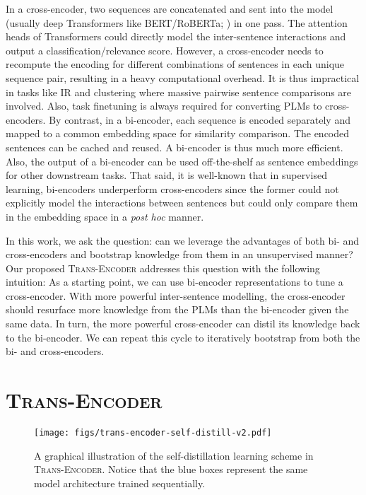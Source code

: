 \documentclass{article} \usepackage{iclr2021_conference,times}
\newcommand{\modelname}{\textsc{Trans-Encoder}\xspace}
\begin{document}
In a cross-encoder, two sequences are concatenated and sent into the model (usually deep Transformers like BERT/RoBERTa; \citealt{devlin2019bert,liu2019roberta}) in one pass. 
The attention heads of Transformers could directly model the inter-sentence interactions and output a classification/relevance score. 
However, a cross-encoder needs to recompute the encoding for different combinations of sentences in each unique sequence pair, resulting in a heavy computational overhead. 
It is thus impractical in tasks like IR and clustering where massive pairwise sentence comparisons are involved. 
Also, task finetuning is always required for converting PLMs to cross-encoders. 
By contrast, in a bi-encoder, each sequence is encoded separately and mapped to a common embedding space for similarity comparison. 
The encoded sentences can be cached and reused. 
A bi-encoder is thus much more efficient. 
Also, the output of a bi-encoder can be used off-the-shelf as sentence embeddings for other downstream tasks. 
That said, it is well-known that in supervised learning, bi-encoders underperform cross-encoders \citep{Humeau2020Poly,thakur-etal-2021-augmented} since the former could not explicitly model the interactions between sentences but could only compare them in the embedding space in a \textit{post hoc} manner.

In this work, we ask the question: can we leverage the advantages of both bi- and cross-encoders and bootstrap knowledge from them in an unsupervised manner? 
Our proposed \modelname addresses this question with the following intuition: As a starting point, we can use bi-encoder representations to tune a cross-encoder. 
With more powerful inter-sentence modelling, the cross-encoder should resurface more knowledge from the PLMs than the bi-encoder given the same data. 
In turn, the more powerful cross-encoder can distil its knowledge back to the bi-encoder. 
We can repeat this cycle to iteratively bootstrap from both the bi- and cross-encoders. 


\section{\modelname}

\begin{figure}
    \centering
    \texttt{[image: figs/trans-encoder-self-distill-v2.pdf]}
    \vspace{-2mm}
    \caption{A graphical illustration of the self-distillation learning scheme in \modelname. Notice that the blue boxes represent the same model architecture trained sequentially. }
    \label{fig:self_distill}
    \vspace{-2.5mm}
\end{figure}
\end{document}
